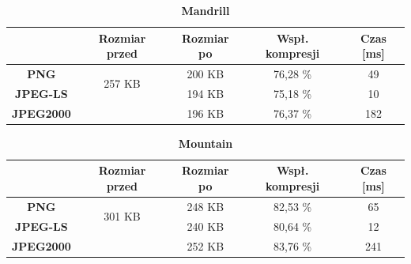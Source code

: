 \begin{table}[!h]
	\centering
	\caption{\textbf{Mandrill}}
	\label{my-label}
	\begin{tabular}{|c|c|c|c|c|}                                             
		\hline
		& \textbf{Rozmiar przed} & \textbf{Rozmiar po} & \textbf{Wspł. kompresji} & \textbf{Czas {[}ms{]}} \\ \hline 
		\textbf{PNG}      &          \multicolumn{1}{c|}{\multirow{2}{*}{257 KB}}             &     200 KB                &        76,28 \%                 &         49                    \\\cline{3-5}
		\textbf{JPEG-LS}  &                        &       194 KB             &        75,18 \%                &           10               \\\cline{3-5}
		\textbf{JPEG2000} &                        &       196 KB              &          76,37 \%               &     182                 \\ \hline
	\end{tabular}
\end{table}

\begin{table}[!h]
	\centering
	\caption{\textbf{Mountain}}
	\label{my-label}
	\begin{tabular}{|c|c|c|c|c|}                                             
		\hline
		& \textbf{Rozmiar przed} & \textbf{Rozmiar po} & \textbf{Wspł. kompresji} & \textbf{Czas {[}ms{]}} \\ \hline 
		\textbf{PNG}      &          \multicolumn{1}{c|}{\multirow{2}{*}{301 KB}}             &       248 KB              &      82,53 \%                   &            65                 \\\cline{3-5}
		\textbf{JPEG-LS}  &                        &       240 KB              &          80,64 \%               &            12              \\\cline{3-5}
		\textbf{JPEG2000} &                        &       252 KB              &          83,76 \%               &       241               \\ \hline
	\end{tabular}
\end{table}

